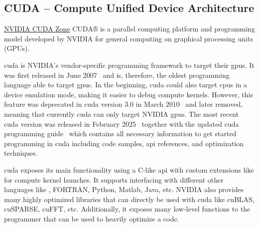 \subsection{CUDA -- Compute Unified Device Architecture}
\label{sec:frameworks:cuda}

\begin{quotebox}{\href{https://developer.nvidia.com/cuda-zone}{NVIDIA CUDA Zone}}
    CUDA® is a parallel computing platform and programming model developed by NVIDIA for general computing on graphical processing units (GPUs).
\end{quotebox}

\acrfull{cuda} is NVIDIA's vendor-specific programming framework to target their \glspl{gpu}. 
It was first released in June 2007~\cite{nvidia_corporation_cuda_2007} and is, therefore, the oldest programming language able to target \glspl{gpu}. 
In the beginning, \gls{cuda} could also target \glspl{cpu} in a device emulation mode, making it easier to debug compute kernels. 
However, this feature was deprecated in \gls{cuda} version 3.0 in March 2010~\cite{nvidia_corporation_cuda_2010} and later removed, meaning that currently \gls{cuda} can only target NVIDIA \glspl{gpu}. 
The most recent \gls{cuda} version was released in February 2025~\cite{nvidia_corporation_cuda_2025-1} together with the updated \gls{cuda} \cpp programming guide~\cite{nvidia_corporation_cuda_2025} which contains all necessary information to get started programming in \gls{cuda} including code samples, \gls{api} references, and optimization techniques. 

\gls{cuda} exposes its main functionality using a C-like \gls{api} with custom extensions like  for compute kernel launches. 
It supports interfacing with different other languages like \cpp, FORTRAN, Python, Matlab, Java, etc. 
NVIDIA also provides many highly optimized libraries that can directly be used with \gls{cuda} like cuBLAS, cuSPARSE, cuFFT, etc. 
Additionally, it exposes many low-level functions to the programmer that can be used to heavily optimize a code. 

